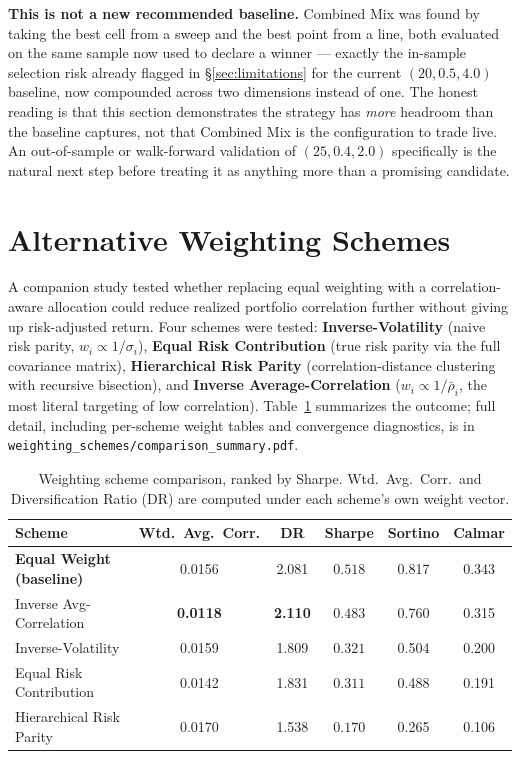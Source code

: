 \documentclass[11pt]{article}
\newcommand{\good}[1]{\textcolor{green!45!black}{#1}}
\begin{document}
\textbf{This is not a new recommended baseline.} Combined Mix was found by taking the best cell from a
sweep and the best point from a line, both evaluated on the same sample now used to declare a winner
--- exactly the in-sample selection risk already flagged in \S\ref{sec:limitations} for the current
$(20, 0.5, 4.0)$ baseline, now compounded across two dimensions instead of one. The honest reading is
that this section demonstrates the strategy has \emph{more} headroom than the baseline captures, not
that Combined Mix is the configuration to trade live. An out-of-sample or walk-forward validation of
$(25, 0.4, 2.0)$ specifically is the natural next step before treating it as anything more than a
promising candidate.

\section{Alternative Weighting Schemes}
\label{sec:weighting}
A companion study tested whether replacing equal weighting with a correlation-aware allocation could
reduce realized portfolio correlation further without giving up risk-adjusted return. Four schemes
were tested: \textbf{Inverse-Volatility} (naive risk parity, $w_i \propto 1/\sigma_i$), \textbf{Equal
Risk Contribution} (true risk parity via the full covariance matrix), \textbf{Hierarchical Risk
Parity} (correlation-distance clustering with recursive bisection), and \textbf{Inverse
Average-Correlation} ($w_i \propto 1/\bar\rho_i$, the most literal targeting of low correlation).
Table~\ref{tab:weighting} summarizes the outcome; full detail, including per-scheme weight tables and
convergence diagnostics, is in \texttt{weighting\_schemes/comparison\_summary.pdf}.

\begin{table}[H]
\centering
\caption{Weighting scheme comparison, ranked by Sharpe. Wtd.\ Avg.\ Corr.\ and Diversification Ratio
(DR) are computed under each scheme's own weight vector.}
\label{tab:weighting}
\begin{tabular}{lccccc}
\toprule
Scheme & Wtd.\ Avg.\ Corr. & DR & Sharpe & Sortino & Calmar \\
\midrule
\textbf{Equal Weight (baseline)} & 0.0156 & 2.081 & \good{$\mathbf{0.518}$} & 0.817 & 0.343 \\
Inverse Avg-Correlation & \textbf{0.0118} & \textbf{2.110} & \good{$0.483$} & 0.760 & 0.315 \\
Inverse-Volatility & 0.0159 & 1.809 & \good{$0.321$} & 0.504 & 0.200 \\
Equal Risk Contribution & 0.0142 & 1.831 & \good{$0.311$} & 0.488 & 0.191 \\
Hierarchical Risk Parity & 0.0170 & 1.538 & \good{$0.170$} & 0.265 & 0.106 \\
\bottomrule
\end{tabular}
\end{table}
\end{document}
